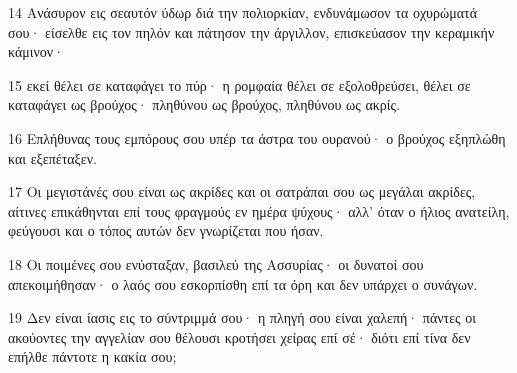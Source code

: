 \par 14 Ανάσυρον εις σεαυτόν ύδωρ διά την πολιορκίαν, ενδυνάμωσον τα οχυρώματά σου· είσελθε εις τον πηλόν και πάτησον την άργιλλον, επισκεύασον την κεραμικήν κάμινον·
\par 15 εκεί θέλει σε καταφάγει το πύρ· η ρομφαία θέλει σε εξολοθρεύσει, θέλει σε καταφάγει ως βρούχος· πληθύνου ως βρούχος, πληθύνου ως ακρίς.
\par 16 Επλήθυνας τους εμπόρους σου υπέρ τα άστρα του ουρανού· ο βρούχος εξηπλώθη και εξεπέταξεν.
\par 17 Οι μεγιστάνές σου είναι ως ακρίδες και οι σατράπαι σου ως μεγάλαι ακρίδες, αίτινες επικάθηνται επί τους φραγμούς εν ημέρα ψύχους· αλλ' όταν ο ήλιος ανατείλη, φεύγουσι και ο τόπος αυτών δεν γνωρίζεται που ήσαν.
\par 18 Οι ποιμένες σου ενύσταξαν, βασιλεύ της Ασσυρίας· οι δυνατοί σου απεκοιμήθησαν· ο λαός σου εσκορπίσθη επί τα όρη και δεν υπάρχει ο συνάγων.
\par 19 Δεν είναι ίασις εις το σύντριμμά σου· η πληγή σου είναι χαλεπή· πάντες οι ακούοντες την αγγελίαν σου θέλουσι κροτήσει χείρας επί σέ· διότι επί τίνα δεν επήλθε πάντοτε η κακία σου;


